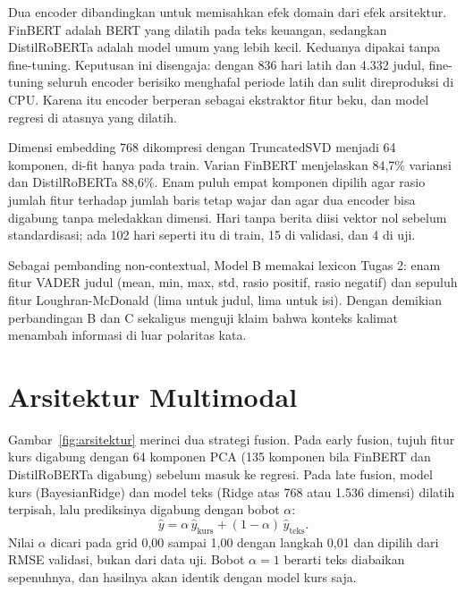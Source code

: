 \documentclass[10pt,a4paper]{article}
\begin{document}
Dua encoder dibandingkan untuk memisahkan efek domain dari efek arsitektur. FinBERT adalah BERT yang dilatih pada teks keuangan, sedangkan DistilRoBERTa adalah model umum yang lebih kecil. Keduanya dipakai tanpa fine-tuning. Keputusan ini disengaja: dengan 836 hari latih dan 4.332 judul, fine-tuning seluruh encoder berisiko menghafal periode latih dan sulit direproduksi di CPU. Karena itu encoder berperan sebagai ekstraktor fitur beku, dan model regresi di atasnya yang dilatih.

Dimensi embedding 768 dikompresi dengan TruncatedSVD menjadi 64 komponen, di-fit hanya pada train. Varian FinBERT menjelaskan 84,7\% variansi dan DistilRoBERTa 88,6\%. Enam puluh empat komponen dipilih agar rasio jumlah fitur terhadap jumlah baris tetap wajar dan agar dua encoder bisa digabung tanpa meledakkan dimensi. Hari tanpa berita diisi vektor nol sebelum standardisasi; ada 102 hari seperti itu di train, 15 di validasi, dan 4 di uji.

Sebagai pembanding non-contextual, Model B memakai lexicon Tugas 2: enam fitur VADER judul (mean, min, max, std, rasio positif, rasio negatif) dan sepuluh fitur Loughran-McDonald (lima untuk judul, lima untuk isi). Dengan demikian perbandingan B dan C sekaligus menguji klaim bahwa konteks kalimat menambah informasi di luar polaritas kata.

\section{Arsitektur Multimodal}
Gambar~\ref{fig:arsitektur} merinci dua strategi fusion. Pada early fusion, tujuh fitur kurs digabung dengan 64 komponen PCA (135 komponen bila FinBERT dan DistilRoBERTa digabung) sebelum masuk ke regresi. Pada late fusion, model kurs (BayesianRidge) dan model teks (Ridge atas 768 atau 1.536 dimensi) dilatih terpisah, lalu prediksinya digabung dengan bobot \(\alpha\):
\[
\hat y = \alpha\,\hat y_{\text{kurs}} + (1-\alpha)\,\hat y_{\text{teks}}.
\]
Nilai \(\alpha\) dicari pada grid 0,00 sampai 1,00 dengan langkah 0,01 dan dipilih dari RMSE validasi, bukan dari data uji. Bobot \(\alpha=1\) berarti teks diabaikan sepenuhnya, dan hasilnya akan identik dengan model kurs saja.
\end{document}
